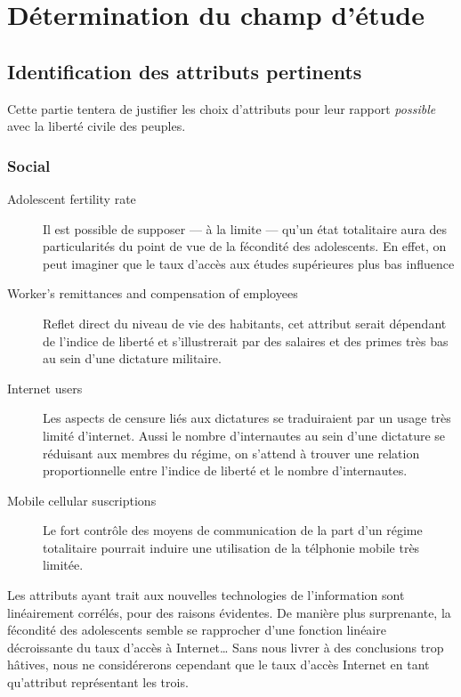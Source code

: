 \section{Détermination du champ d'étude}
\subsection{Identification des attributs pertinents}
Cette partie tentera de justifier les choix d'attributs pour leur rapport \emph{possible} avec la liberté civile des peuples.
\subsubsection{Social}
\begin{description}
\item [Adolescent fertility rate] 
Il est possible de supposer --- à la limite --- qu'un état totalitaire aura des particularités du point de vue de la fécondité des adolescents. En effet, on peut imaginer que le taux d'accès aux études supérieures plus bas influence 
\item [Worker's remittances and compensation of employees]
Reflet direct du niveau de vie des habitants, cet attribut serait dépendant de l'indice de liberté et s'illustrerait par des salaires et des primes très bas au sein d'une dictature militaire.
\item [Internet users]
Les aspects de censure liés aux dictatures se traduiraient par un usage très limité d'internet. Aussi le nombre d'internautes 
au sein d'une dictature se réduisant aux membres du régime, on s'attend à trouver une relation proportionnelle entre l'indice de liberté et le nombre d'internautes.
\item [Mobile cellular suscriptions]
Le fort contrôle des moyens de communication de la part d'un régime totalitaire pourrait induire une utilisation de la télphonie mobile très limitée.
\end{description}

Les attributs ayant trait aux nouvelles technologies de l'information sont linéairement corrélés, pour des raisons évidentes. De manière plus surprenante, la fécondité des adolescents semble se rapprocher d'une fonction linéaire décroissante du taux d'accès à Internet\ldots
Sans nous livrer à des conclusions trop hâtives, nous ne considérerons cependant que le taux d'accès Internet en tant qu'attribut représentant les trois.

